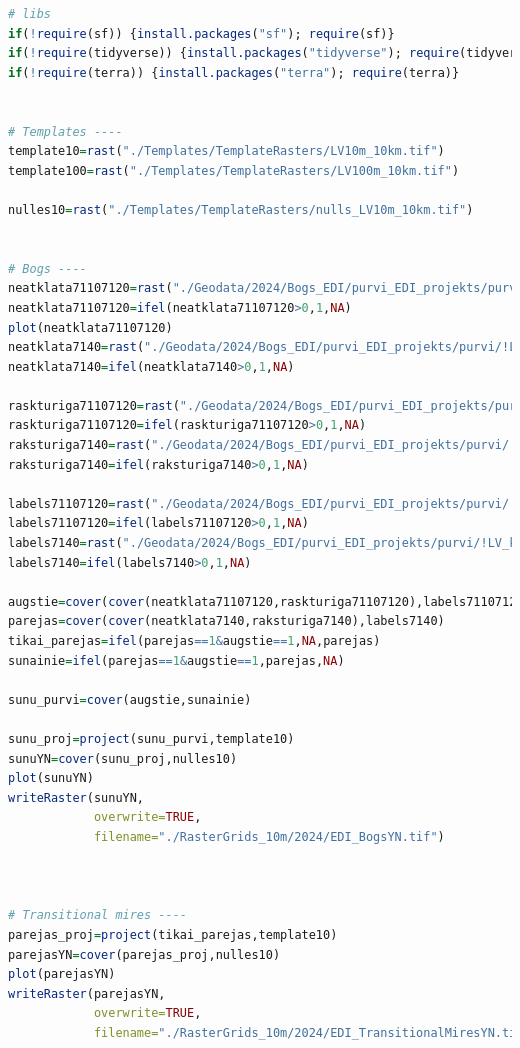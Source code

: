 \documentclass[
]{book}
\begin{document}
\begin{lstlisting}[language=R]
# libs
if(!require(sf)) {install.packages("sf"); require(sf)}
if(!require(tidyverse)) {install.packages("tidyverse"); require(tidyverse)}
if(!require(terra)) {install.packages("terra"); require(terra)}


# Templates ----
template10=rast("./Templates/TemplateRasters/LV10m_10km.tif")
template100=rast("./Templates/TemplateRasters/LV100m_10km.tif")

nulles10=rast("./Templates/TemplateRasters/nulls_LV10m_10km.tif")


# Bogs ----
neatklata71107120=rast("./Geodata/2024/Bogs_EDI/purvi_EDI_projekts/purvi/!LV_kopa_apv1020_30_05_2022/!LV_kopa_apv1020_30_05_2022/Neatklata_purviem_raksturiga_zemsedze_7110_7120.tif")
neatklata71107120=ifel(neatklata71107120>0,1,NA)
plot(neatklata71107120)
neatklata7140=rast("./Geodata/2024/Bogs_EDI/purvi_EDI_projekts/purvi/!LV_kopa_apv1020_30_05_2022/!LV_kopa_apv1020_30_05_2022/Neatklata_purviem_raksturiga_zemsedze_7140.tif")
neatklata7140=ifel(neatklata7140>0,1,NA)

raskturiga71107120=rast("./Geodata/2024/Bogs_EDI/purvi_EDI_projekts/purvi/!LV_kopa_apv1020_30_05_2022/!LV_kopa_apv1020_30_05_2022/Purviem_neraksturiga_zemsedze_7110_7120.tif")
raskturiga71107120=ifel(raskturiga71107120>0,1,NA)
raksturiga7140=rast("./Geodata/2024/Bogs_EDI/purvi_EDI_projekts/purvi/!LV_kopa_apv1020_30_05_2022/!LV_kopa_apv1020_30_05_2022/Purviem_neraksturiga_zemsedze_7140.tif")
raksturiga7140=ifel(raksturiga7140>0,1,NA)

labels71107120=rast("./Geodata/2024/Bogs_EDI/purvi_EDI_projekts/purvi/!LV_kopa_apv1020_30_05_2022/!LV_kopa_apv1020_30_05_2022/latvija_Labels_B7110_7120.tif")
labels71107120=ifel(labels71107120>0,1,NA)
labels7140=rast("./Geodata/2024/Bogs_EDI/purvi_EDI_projekts/purvi/!LV_kopa_apv1020_30_05_2022/!LV_kopa_apv1020_30_05_2022/latvija_Labels_B7140.tif")
labels7140=ifel(labels7140>0,1,NA)

augstie=cover(cover(neatklata71107120,raskturiga71107120),labels71107120)
parejas=cover(cover(neatklata7140,raksturiga7140),labels7140)
tikai_parejas=ifel(parejas==1&augstie==1,NA,parejas)
sunainie=ifel(parejas==1&augstie==1,parejas,NA)

sunu_purvi=cover(augstie,sunainie)

sunu_proj=project(sunu_purvi,template10)
sunuYN=cover(sunu_proj,nulles10)
plot(sunuYN)
writeRaster(sunuYN,
            overwrite=TRUE,
            filename="./RasterGrids_10m/2024/EDI_BogsYN.tif")



# Transitional mires ----
parejas_proj=project(tikai_parejas,template10)
parejasYN=cover(parejas_proj,nulles10)
plot(parejasYN)
writeRaster(parejasYN,
            overwrite=TRUE,
            filename="./RasterGrids_10m/2024/EDI_TransitionalMiresYN.tif")
\end{lstlisting}
\end{document}
